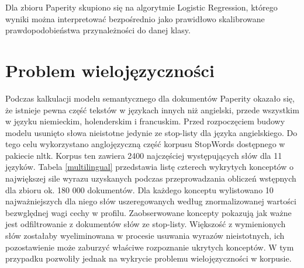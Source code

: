 \documentclass{pracamgr}
\begin{document}
Dla zbioru Paperity skupiono się na algorytmie Logistic Regression, którego wyniki można interpretować bezpośrednio jako prawidłowo skalibrowane prawdopodobieństwa przynależności do danej klasy. 

\section{Problem wielojęzyczności}
Podczas kalkulacji modelu semantycznego dla dokumentów Paperity okazało się, że istnieje pewna część tekstów w językach innych niż angielski, przede wszystkim w języku niemieckim, holenderskim i francuskim. Przed rozpoczęciem budowy modelu usunięto słowa nieistotne jedynie ze stop-listy dla języka angielskiego. Do tego celu wykorzystano anglojęzyczną część korpusu StopWords dostępnego w pakiecie nltk. Korpus ten zawiera 2400 najczęściej występujących słów dla 11 języków. Tabela \ref{multilingual} przedstawia listę czterech wykrytych konceptów o największej sile wyrazu uzyskanych podczas przeprowadzania obliczeń wstępnych dla zbioru ok. 180 000 dokumentów. Dla każdego konceptu wylistowano 10 najważniejszych dla niego słów uszeregowanych według znormalizowanej wartości bezwględnej wagi cechy w profilu. Zaobserwowane koncepty pokazują jak ważne jest odfiltrowanie z dokumentów słów ze stop-listy. Większość z wymienionych słów zostałaby wyeliminowana w procesie usuwania wyrazów nieistotnych, ich pozostawienie może zaburzyć właściwe rozpoznanie ukrytych konceptów. W tym przypadku pozwoliły jednak na wykrycie problemu wielojęzyczności w korpusie.
\end{document}
